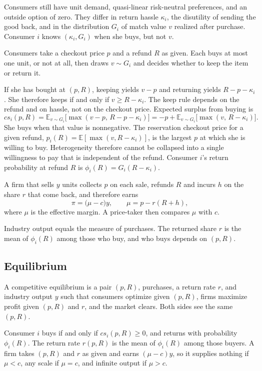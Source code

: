 \documentclass[11pt]{article}
\begin{document}
Consumers still have unit demand, quasi-linear risk-neutral preferences, and
an outside option of zero. They differ in return hassle $\kappa_i$, the
disutility of sending the good back, and in the distribution $G_i$ of match
value $v$ realized after purchase. Consumer $i$ knows $(\kappa_i,G_i)$ when
she buys, but not $v$.

Consumers take a checkout price $p$ and a refund $R$ as given. Each buys at
most one unit, or not at all, then draws $v\sim G_i$ and decides whether to
keep the item or return it.

If she has bought at $(p,R)$, keeping yields $v-p$ and returning yields
$R-p-\kappa_i$. She therefore keeps if and only if $v\geq R-\kappa_i$. The
keep rule depends on the refund and on hassle, not on the checkout price.
Expected surplus from buying is
\[
  cs_i(p,R)
  =
  \mathbb{E}_{v\sim G_i}\bigl[\max(v-p,\,R-p-\kappa_i)\bigr]
  =
  -p+\mathbb{E}_{v\sim G_i}\bigl[\max(v,\,R-\kappa_i)\bigr].
\]
She buys when that value is nonnegative. The reservation checkout price for
a given refund, $p_i(R)=\mathbb{E}[\max(v,R-\kappa_i)]$, is the largest $p$
at which she is willing to buy. Heterogeneity therefore cannot be collapsed
into a single willingness to pay that is independent of the refund. Consumer
$i$'s return probability at refund $R$ is $\phi_i(R)=G_i(R-\kappa_i)$.

A firm that sells $y$ units collects $p$ on each sale, refunds $R$ and
incurs $h$ on the share $r$ that come back, and therefore earns
\[
  \pi=\bigl(\mu-c\bigr)y,
  \qquad
  \mu=p-r(R+h),
\]
where $\mu$ is the effective margin. A price-taker then compares $\mu$ with
$c$.

Industry output equals the measure of purchases. The returned share $r$ is
the mean of $\phi_i(R)$ among those who buy, and who buys depends on $(p,R)$.

\subsection{Equilibrium}

A competitive equilibrium is a pair $(p,R)$, purchases, a return rate $r$,
and industry output $y$ such that consumers optimize given $(p,R)$,
firms maximize profit given $(p,R)$ and $r$, and the market clears.
Both sides see the same $(p,R)$.

Consumer $i$ buys if and only if $cs_i(p,R)\geq 0$, and returns with
probability $\phi_i(R)$. The return rate $r(p,R)$ is the mean of
$\phi_i(R)$ among those buyers. A firm takes $(p,R)$ and $r$ as given and
earns $(\mu-c)y$, so it supplies nothing if $\mu<c$, any scale if $\mu=c$,
and infinite output if $\mu>c$.
\end{document}
